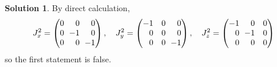 \documentclass[11pt, a4paper]{report}
\theoremstyle{definition}
\newtheorem{sol}{Solution}[part]
\newcommand*{\ralminus}{\ensuremath\:\, \mathllap{-}}
\begin{document}
\begin{sol}

By direct calculation,
\[
    J_x^2 = \begin{pmatrix*}[r]
            0 &           0 & 0 \\
            0 & \ralminus 1 & 0 \\
            0 &           0 & \ralminus 1
        \end{pmatrix*}, \quad
    J_y^2 = \begin{pmatrix*}[r]
            -1 & 0 & 0 \\
             0 & 0 & 0 \\
             0 & 0 & \ralminus 1
        \end{pmatrix*}, \quad
    J_z^2 = \begin{pmatrix*}[r]
            -1 &           0 & 0 \\
             0 & \ralminus 1 & 0 \\
             0 &           0 & 0
        \end{pmatrix*}
\]
so the first statement is false.


\end{sol}
\end{document}
